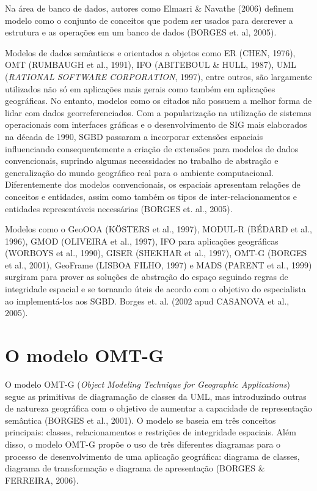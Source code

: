 	 Na área de banco de dados, autores como Elmasri \& Navathe (2006) definem modelo como o conjunto de conceitos que podem ser usados para descrever a estrutura e as operações em um banco de dados (BORGES et. al, 2005).
	           
	   Modelos de dados semânticos e orientados a objetos como ER (CHEN, 1976), OMT (RUMBAUGH et al., 1991), IFO (ABITEBOUL \& HULL, 1987), UML (\textit{RATIONAL SOFTWARE CORPORATION}, 1997), entre outros, são largamente utilizados não só em aplicações mais gerais como também em aplicações geográficas. No entanto, modelos como os citados não possuem a melhor forma de lidar com dados georreferenciados. Com a popularização na utilização de sistemas operacionais com interfaces gráficas e o desenvolvimento de SIG mais elaborados na década de 1990, SGBD passaram a incorporar extensões espaciais influenciando consequentemente a criação de extensões para modelos de dados convencionais, suprindo algumas necessidades no trabalho de abstração e generalização do mundo geográfico real para o ambiente computacional. Diferentemente dos modelos convencionais, os espaciais apresentam relações de conceitos e entidades, assim como também os tipos de inter-relacionamentos e entidades representáveis necessárias (BORGES et. al., 2005).       
	   
	   Modelos como o GeoOOA (KÖSTERS et al., 1997), MODUL-R (BÉDARD et al., 1996), GMOD (OLIVEIRA et al., 1997), IFO para aplicações geográficas (WORBOYS et al., 1990), GISER (SHEKHAR et al., 1997), OMT-G (BORGES et al., 2001), GeoFrame (LISBOA FILHO, 1997) e MADS (PARENT et al., 1999) surgiram para prover as soluções de abstração do espaço seguindo regras de integridade espacial e se tornando úteis de acordo com o objetivo do especialista ao implementá-los aos SGBD. Borges et. al. (2002 apud CASANOVA et al., 2005).
	   
	   \section{O modelo OMT-G}
	   
	   O modelo OMT-G (\textit{Object Modeling Technique for Geographic Applications}) segue as primitivas de diagramação de classes da UML, mas introduzindo outras de natureza geográfica com o objetivo de aumentar a capacidade de representação semântica (BORGES et al., 2001). O modelo se baseia em três conceitos principais: classes, relacionamentos e restrições de integridade espaciais. Além disso, o modelo OMT-G propõe o uso de três diferentes diagramas para o processo de desenvolvimento de uma aplicação geográfica: diagrama de classes, diagrama de transformação e diagrama de apresentação (BORGES \& FERREIRA, 2006).
	   
